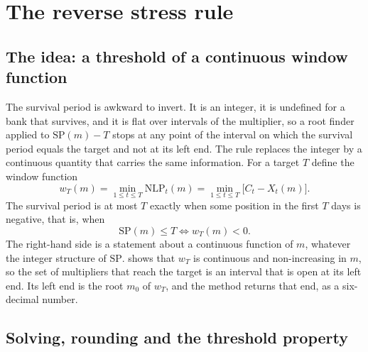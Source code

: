 \section{The reverse stress rule}
\label{sec:proposed-method}

\subsection{The idea: a threshold of a continuous window function}

The survival period is awkward to invert. It is an integer, it is undefined for a bank that survives, and it is flat over intervals of the multiplier, so a root finder applied to $\mathrm{SP}(m)-T$ stops at any point of the interval on which the survival period equals the target and not at its left end. The rule replaces the integer by a continuous quantity that carries the same information. For a target $T$ define the window function
\begin{equation}
w_T(m)=\min_{1\le t\le T}\mathrm{NLP}_t(m)=\min_{1\le t\le T}\bigl[C_t-X_t(m)\bigr].
\label{eq:window}
\end{equation}
The survival period is at most $T$ exactly when some position in the first $T$ days is negative, that is, when
\begin{equation}
\mathrm{SP}(m)\le T\iff w_T(m)<0.
\label{eq:equivalence}
\end{equation}
The right-hand side is a statement about a continuous function of $m$, whatever the integer structure of $\mathrm{SP}$.  shows that $w_T$ is continuous and non-increasing in $m$, so the set of multipliers that reach the target is an interval that is open at its left end. Its left end is the root $m_0$ of $w_T$, and the method returns that end, as a six-decimal number.

\subsection{Solving, rounding and the threshold property}

